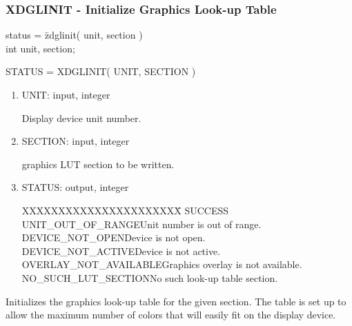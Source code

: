 \subsubsection{XDGLINIT - Initialize Graphics Look-up Table}
\begin{tabbing}
status = \=zdglinit( unit, section )\\
\>int  unit, section;\\
\end{tabbing}
STATUS = XDGLINIT( UNIT, SECTION )
\begin{enumerate}
\item UNIT:  input, integer

Display device unit number.
\item SECTION:  input, integer

graphics LUT section to be written.
\item STATUS:  output, integer
\begin{tabbing}
XXXXXXXXXXXXXXXXXXXXXX\=\kill
SUCCESS\\
UNIT\_OUT\_OF\_RANGE\>Unit number is out of range.\\
DEVICE\_NOT\_OPEN\>Device is not open.\\
DEVICE\_NOT\_ACTIVE\>Device is not active.\\
OVERLAY\_NOT\_AVAILABLE\>Graphics overlay is not available.\\
NO\_SUCH\_LUT\_SECTION\>No such look-up table section.\\
\end{tabbing}
\end{enumerate}
Initializes the graphics look-up table for the given section.
The table is set up to allow the maximum number of colors that
will easily fit on the display device.
\newpage
